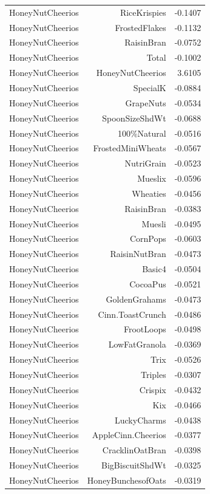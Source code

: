 \begin{longtable}{@{}lrr@{}}
HoneyNutCheerios & RiceKrispies & -0.1407 \\
HoneyNutCheerios & FrostedFlakes & -0.1132 \\
HoneyNutCheerios & RaisinBran & -0.0752 \\
HoneyNutCheerios & Total & -0.1002 \\
HoneyNutCheerios & HoneyNutCheerios & 3.6105 \\
HoneyNutCheerios & SpecialK & -0.0884 \\
HoneyNutCheerios & GrapeNuts & -0.0534 \\
HoneyNutCheerios & SpoonSizeShdWt & -0.0688 \\
HoneyNutCheerios & 100\%Natural & -0.0516 \\
HoneyNutCheerios & FrostedMiniWheats & -0.0567 \\
HoneyNutCheerios & NutriGrain & -0.0523 \\
HoneyNutCheerios & Mueslix & -0.0596 \\
HoneyNutCheerios & Wheaties & -0.0456 \\
HoneyNutCheerios & RaisinBran & -0.0383 \\
HoneyNutCheerios & Muesli & -0.0495 \\
HoneyNutCheerios & CornPops & -0.0603 \\
HoneyNutCheerios & RaisinNutBran & -0.0473 \\
HoneyNutCheerios & Basic4 & -0.0504 \\
HoneyNutCheerios & CocoaPus & -0.0521 \\
HoneyNutCheerios & GoldenGrahams & -0.0473 \\
HoneyNutCheerios & Cinn.ToastCrunch & -0.0486 \\
HoneyNutCheerios & FrootLoops & -0.0498 \\
HoneyNutCheerios & LowFatGranola & -0.0369 \\
HoneyNutCheerios & Trix & -0.0526 \\
HoneyNutCheerios & Triples & -0.0307 \\
HoneyNutCheerios & Crispix & -0.0432 \\
HoneyNutCheerios & Kix & -0.0466 \\
HoneyNutCheerios & LuckyCharms & -0.0438 \\
HoneyNutCheerios & AppleCinn.Cheerios & -0.0377 \\
HoneyNutCheerios & CracklinOatBran & -0.0398 \\
HoneyNutCheerios & BigBiscuitShdWt & -0.0325 \\
HoneyNutCheerios & HoneyBunchesofOats & -0.0319 \\

\end{longtable}
